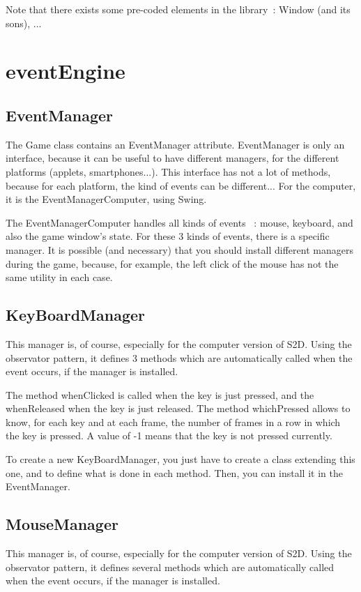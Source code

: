 \documentclass[a4paper,11pt]{report}
\begin{document}
			Note that there exists some pre-coded elements in the library~: Window (and its sons), ...
	
	\section{eventEngine}
		\subsection{EventManager}
			The Game class contains an EventManager attribute.
			EventManager is only an interface, because it can be useful to have different managers, for the different platforms (applets, smartphones...).
			This interface has not a lot of methods, because for each platform, the kind of events can be different...
			For the computer, it is the EventManagerComputer, using Swing.
			
			The EventManagerComputer handles all kinds of events ~: mouse, keyboard, and also the game window's state.
			For these 3 kinds of events, there is a specific manager.
			It is possible (and necessary) that you should install different managers during the game, because, for example,
			the left click of the mouse has not the same utility in each case.
			
		\subsection{KeyBoardManager}
			This manager is, of course, especially for the computer version of S2D.
			Using the observator pattern, it defines 3 methods which are automatically called when the event occurs, if the manager is installed.
			
			The method whenClicked is called when the key is just pressed, and the whenReleased when the key is just released.
			The method whichPressed allows to know, for each key and at each frame, the number of frames in a row in which the key is pressed.
			A value of -1 means that the key is not pressed currently.
			
			To create a new KeyBoardManager, you just have to create a class extending this one, and to define what is done in each method.
			Then, you can install it in the EventManager.
			
		\subsection{MouseManager}
			This manager is, of course, especially for the computer version of S2D.
			Using the observator pattern, it defines several methods which are automatically called when the event occurs, if the manager is installed.
			
\end{document}

